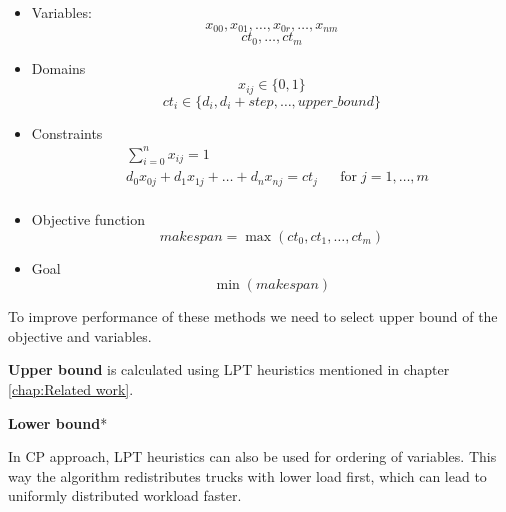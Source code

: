 \documentclass{ctuthesis}
\begin{document}
\begin{itemize}
    \item Variables:\\
    \begin{equation}
        x_{00}, x_{01}, \ldots, x_{0r}, \ldots, x_{nm}
    \end{equation}
    \begin{equation}
        ct_0, \ldots, ct_m
    \end{equation}
    \item Domains\\
    \begin{equation}
    x_{ij} \in \{0, 1\}
    \end{equation}
    \begin{equation}
    ct_{i} \in \{ d_i, d_i + step, \ldots, upper\_bound\}
    \end{equation}
    \item Constraints
    \begin{equation}
    \begin{aligned}
    & \sum_{i=0}^{n} x_{ij} = 1 &&\\
    & d_0x_{0j} + d_1x_{1j} + \ldots + d_nx_{nj} = ct_j && \text{for}\; j = 1, \ldots, m\\
    \end{aligned}
    \end{equation}
    \item Objective function\\
    \begin{equation}
        makespan = \max(ct_0, ct_1, \ldots, ct_m)
    \end{equation}
    \item Goal\\
    \begin{equation}
        \min(makespan)
    \end{equation}
\end{itemize}

To improve performance of these methods we need to select upper bound of the objective and variables.

\textbf{Upper bound} is calculated using LPT heuristics mentioned in chapter \ref{chap:Related work}.

\textbf{Lower bound}*

In CP approach, LPT heuristics can also be used for ordering of variables. This way the algorithm redistributes trucks with lower load first, which can lead to uniformly distributed workload faster.
\end{document}
